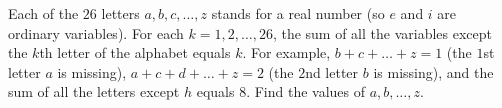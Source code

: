 Each of the $26$ letters $a,b,c,\dots,z$ stands for a real number (so $e$ and $i$ are ordinary variables). For each $k=1,2,\dots,26$, the sum of all the variables except the $k$th letter of the alphabet equals $k$. For example, $b+c+\dots+z=1$ (the $1$st letter $a$ is missing), $a+c+d+\dots+z=2$ (the $2$nd letter $b$ is missing), and the sum of all the letters except $h$ equals $8$. Find the values of $a,b,\dots,z$.
